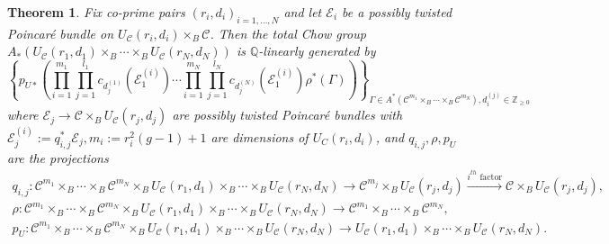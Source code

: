 \documentclass[11pt]{amsart}
\newtheorem{theorem}{Theorem}[section]
\theoremstyle{definition}
\newcommand{\ri}{\rightarrow}
\newcommand{\E}{\mathscr{E}}
\newcommand{\Q}{\mathbb{Q}}
\begin{document}
\begin{theorem}\label{thm:gen-bun}
    Fix co-prime pairs $(r_i,d_i)_{i=1,\dots, N}$ and let $\mathcal E_i$ be a possibly twisted Poincar\'e bundle on $ U_{\mathcal C}(r_i,d_i)\times_B \mathcal C$. Then the total Chow group  $A_*( U_{\mathcal C}(r_1,d_1) \times_B \cdots \times_B  U_{\mathcal C}(r_N, d_N))$ is $\Q$-linearly generated by 
    \begin{equation}\label{eq6}
        \left \{ p_{U*} \left ( \prod_{i=1}^{m_1}\prod_{j=1}^{l_1} c_{d^{(1)}_j} (\mathcal E_1^{(i)}) \cdots\prod_{i=1}^{m_N}\prod_{j=1}^{l_N}c_{d^{(N)}_j} (\mathcal E_1^{(i)}) \rho^* (\Gamma)\right )  \right \}_{\Gamma\in A^*(\mathcal C^{m_1}\times_B  \cdots \times_B \mathcal C^{m_N}), d_i^{(j)}\in \mathbb Z_{\geq 0}}
    \end{equation}
    where $\mathcal E_j\ri \mathcal C\times_B U_{\mathcal C}(r_j,d_j)$ are possibly twisted Poincar\'e bundles with $\E_j^{(i)}:= q_{i,j}^*\E_j, m_i:= r_i^2(g-1)+1$ are dimensions of $U_C(r_i,d_i)$, and $q_{i,j}, \rho,p_U$ are the projections
    \begin{gather*} 
    q_{i,j}:\mathcal C^{m_1} \times_B \cdots \times_B \mathcal  C^{m_N} \times_B  U_{\mathcal C}(r_1,d_1) \times _B\cdots \times_B  U_\mathcal C(r_N, d_N)\rightarrow  \mathcal C^{m_j}\times_B U_{\mathcal C}(r_j,d_j)  \xrightarrow{i^{th}\text{ factor}} \mathcal C\times_B U_{\mathcal C}(r_j,d_j), \\
    \rho:\mathcal C^{m_1} \times_B \cdots \times_B \mathcal  C^{m_N} \times_B  U_{\mathcal C}(r_1,d_1) \times _B\cdots \times_B  U_\mathcal C(r_N, d_N)\rightarrow \mathcal C^{m_1} \times_B \cdots \times_B \mathcal  C^{m_N}, \\ p_U:  \mathcal C^{m_1} \times_B \cdots \times_B \mathcal  C^{m_N} \times_B  U_{\mathcal C}(r_1,d_1) \times _B\cdots \times_B  U_\mathcal C(r_N, d_N)\rightarrow U_{\mathcal C}(r_1,d_1) \times _B\cdots \times_B  U_\mathcal C(r_N, d_N).\end{gather*}  
\end{theorem}
\end{document}
